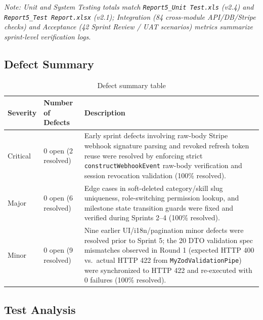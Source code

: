 \documentclass[12pt,a4paper]{article}
\newcommand{\hd}[1]{\textbf{#1}}
\begin{document}
\noindent\textit{Note: Unit and System Testing totals match \texttt{Report5\_Unit Test.xls} (v2.4) and \texttt{Report5\_Test Report.xlsx} (v2.1); Integration (84 cross-module API/DB/Stripe checks) and Acceptance (42 Sprint Review / UAT scenarios) metrics summarize sprint-level verification logs.}

\subsection{Defect Summary}

\begin{table}[H]
\caption{Defect summary table}
\begin{tabularx}{\textwidth}{|L{2.3cm}|L{3.1cm}|Y|}
\hline
{}\hd{Severity} & \hd{Number of Defects} & \hd{Description} \\ \hline
Critical & 0 open \newline (2 resolved) & Early sprint defects involving raw-body Stripe webhook signature parsing and revoked refresh token reuse were resolved by enforcing strict \texttt{constructWebhookEvent} raw-body verification and session revocation validation (100\% resolved). \\ \hline
Major & 0 open \newline (6 resolved) & Edge cases in soft-deleted category/skill slug uniqueness, role-switching permission lookup, and milestone state transition guards were fixed and verified during Sprints 2--4 (100\% resolved). \\ \hline
Minor & 0 open \newline (9 resolved) & Nine earlier UI/i18n/pagination minor defects were resolved prior to Sprint 5; the 20 DTO validation spec mismatches observed in Round 1 (expected HTTP 400 vs.\ actual HTTP 422 from \texttt{MyZodValidationPipe}) were synchronized to HTTP 422 and re-executed with 0 failures (100\% resolved). \\ \hline
\end{tabularx}
\end{table}

\subsection{Test Analysis}
\end{document}
